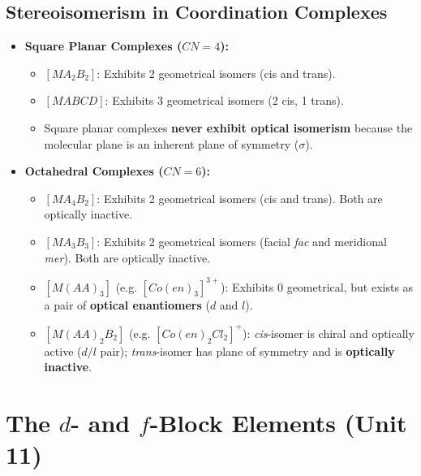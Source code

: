 \documentclass[10pt,twoside,openright]{book}
\begin{document}
\subsection{Stereoisomerism in Coordination Complexes}

\begin{usecasebox}
\begin{itemize}
  \item \textbf{Square Planar Complexes ($CN=4$):}
  \begin{itemize}
    \item $[MA_2B_2]$: Exhibits 2 geometrical isomers (cis and trans).
    \item $[MABCD]$: Exhibits 3 geometrical isomers (2 cis, 1 trans).
    \item Square planar complexes \textbf{never exhibit optical isomerism} because the molecular plane is an inherent plane of symmetry ($\sigma$).
  \end{itemize}
  \item \textbf{Octahedral Complexes ($CN=6$):}
  \begin{itemize}
    \item $[MA_4B_2]$: Exhibits 2 geometrical isomers (cis and trans). Both are optically inactive.
    \item $[MA_3B_3]$: Exhibits 2 geometrical isomers (facial \textit{fac} and meridional \textit{mer}). Both are optically inactive.
    \item $[M(AA)_3]$ (e.g. $[Co(en)_3]^{3+}$): Exhibits 0 geometrical, but exists as a pair of \textbf{optical enantiomers} ($d$ and $l$).
    \item $[M(AA)_2B_2]$ (e.g. $[Co(en)_2Cl_2]^+$): \textit{cis}-isomer is chiral and optically active ($d/l$ pair); \textit{trans}-isomer has plane of symmetry and is \textbf{optically inactive}.
  \end{itemize}
\end{itemize}
\end{usecasebox}

\newpage

\section{The $d$- and $f$-Block Elements (Unit 11)}
\end{document}
